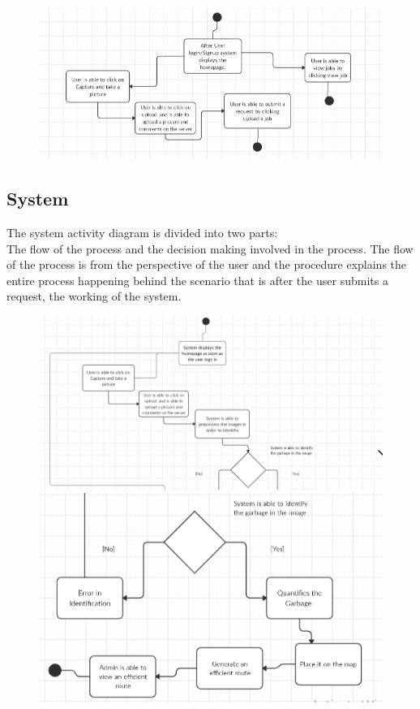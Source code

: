 \begin{figure}[!hb]
   \centering

   \includegraphics[scale=0.4]{images/User_3.PNG}
\end{figure}
\newpage
\subsection{System}
The system activity diagram is divided into two parts: \\
The flow of the process and the decision making involved in the process. The flow of the process is from  the perspective of the user and the procedure explains the entire process happening behind the scenario that is after the user submits a request, the working of the system.

\begin{figure}[!hb]
   \centering

   \includegraphics[scale=0.6]{images/UserSystem_1.PNG}
   \includegraphics[scale=0.6]{images/UserSystem_2.PNG}
   
\end{figure}

